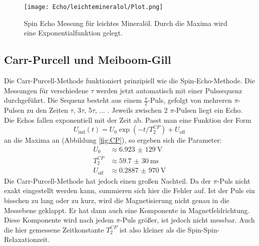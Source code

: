 \documentclass[10pt,twoside]{article}
\renewcommand{\1}{^{-1}}
\renewcommand{\2}{^{-2}}
\newcommand{\3}{^{-3}}
\newcommand{\4}{^{-4}}
\newcommand{\5}{^{-5}}
\newcommand{\6}{^{-6}}
\newcommand{\7}{^{-7}}
\newcommand{\8}{^{-8}}
\newcommand{\9}{^{-9}}
\begin{document}
\begin{figure}[H]
\centering
\texttt{[image: Echo/leichtemineralol/Plot.png]}
\caption{Spin Echo Messung für leichtes Mineralöl. Durch die Maxima wird eine Exponentialfunktion gelegt.}
\label{fig:SE}
\end{figure}

\subsection{Carr-Purcell und Meiboom-Gill}

Die Carr-Purcell-Methode funktioniert prinzipiell wie die Spin-Echo-Methode. Die Messungen für verschiedene $\tau$ werden jetzt automatisch mit einer Pulssequenz durchgeführt. Die Sequenz besteht aus einem $\frac{\pi}{2}$-Puls, gefolgt von mehreren $\pi$-Pulsen zu den Zeiten $\tau$, 3$\tau$, 5$\tau$, ... . Jeweils zwischen 2 $\pi$-Pulsen liegt ein Echo. Die Echos fallen exponentiell mit der Zeit ab. Passt man eine Funktion der Form
\begin{equation}
U_{\text{ind}}(t)=U_0 \exp(-t/T_{2}^{CP}) + U_{\text{off}}
\end{equation}
an die Maxima an (Abbildung \ref{fig:CP}), so ergeben sich die Parameter:
\begin{align*} 
U_0 	&\approx  \SI{6,923(129)}{\volt} \\ 
T_{2}^{CP} &\approx  \SI{59,7(30)}{\milli\second} \\
U_{\text{off}}	&\approx  \SI{0,2887(970)}{\volt} 
\end{align*}
Die Carr-Purcell-Methode hat jedoch einen großen Nachteil. Da der $\pi$-Puls nicht exakt eingestellt werden kann, summieren sich hier die Fehler auf. Ist der Puls ein bisschen zu lang oder zu kurz, wird die Magnetisierung nicht genau in die Messebene geklappt. Er hat dann auch eine Komponente in Magnetfeldrichtung. Diese Komponente wird nach jedem $\pi$-Puls größer, ist jedoch nicht messbar.
Auch die hier gemessene Zeitkonstante $T_2^{CP}$ ist also kleiner als die Spin-Spin-Relaxationzeit.
\end{document}

